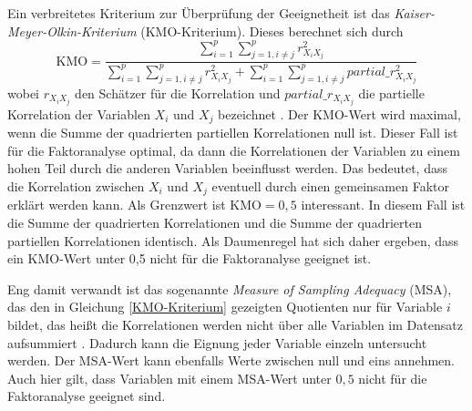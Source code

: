 \documentclass[11pt]{scrartcl}
\begin{document}
	Ein verbreitetes Kriterium zur Überprüfung der Geeignetheit ist das \textit{Kaiser-Meyer-Olkin-Kriterium}
	(KMO-Kriterium). Dieses berechnet sich durch
	\begin{equation} \label{KMO-Kriterium}
		\text{KMO} = \frac{\sum\limits_{i = 1}^{p} \sum\limits_{j=1, i \neq j}^{p} r_{X_i X_j}^2}
		{\sum\limits_{i = 1}^{p} \sum\limits_{j=1, i \neq j}^{p} r_{X_i X_j}^2 + \sum\limits_{i = 1}^{p} \sum\limits_{j=1, i \neq j}^{p} partial\_r_{X_i X_j}^2}
	\end{equation}
	wobei $r_{X_i X_j}$ den Schätzer für die Korrelation und $partial\_r_{X_i X_j}$
	die partielle Korrelation der Variablen $X_i$ und $X_j$ bezeichnet \parencite[423]{Backhaus.2021}. Der KMO-Wert wird maximal, wenn die
	Summe der quadrierten partiellen Korrelationen null ist. Dieser Fall ist für die Faktoranalyse optimal, da
	dann die Korrelationen der Variablen zu einem hohen Teil durch die anderen Variablen beeinflusst werden.
	Das bedeutet, dass die Korrelation zwischen $X_i$ und $X_j$ eventuell durch einen gemeinsamen
	Faktor erklärt werden kann.  Als Grenzwert ist $\text{KMO}=0{,}5$ interessant. In diesem Fall
	ist die Summe der quadrierten Korrelationen und die Summe der quadrierten partiellen Korrelationen identisch.
	Als Daumenregel hat sich daher ergeben, dass ein KMO-Wert unter 0,5 nicht für die Faktoranalyse geeignet ist.
	
	Eng damit verwandt ist das sogenannte \textit{Measure of Sampling Adequacy} (MSA), das
	den in Gleichung \ref{KMO-Kriterium} gezeigten Quotienten nur für Variable $i$ bildet, das heißt die Korrelationen werden
	nicht über alle Variablen im Datensatz aufsummiert \parencite[424]{Backhaus.2021}. Dadurch kann die Eignung jeder Variable
	einzeln untersucht werden. Der MSA-Wert kann ebenfalls Werte zwischen null und eins annehmen. Auch hier gilt,
	dass Variablen mit einem MSA-Wert unter $0{,}5$ nicht für die Faktoranalyse geeignet sind.	
\end{document}
